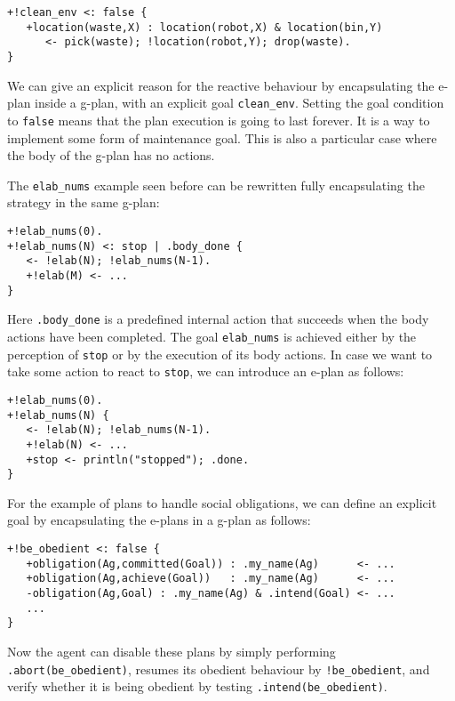 \begin{small}
\begin{verbatim}
+!clean_env <: false {
   +location(waste,X) : location(robot,X) & location(bin,Y)
      <- pick(waste); !location(robot,Y); drop(waste).
}
\end{verbatim}
\end{small}

\noindent We can give an explicit reason for the reactive behaviour by encapsulating the e-plan inside a g-plan, with an explicit goal \texttt{clean\_env}.
%
Setting the goal condition to \texttt{false} means that the plan
execution is going to last forever. It is a way to implement some form
of maintenance goal.
%
This is also a particular case where the body of the g-plan has no actions.
%

The \texttt{elab\_nums} example seen before can be rewritten fully encapsulating the strategy in the same g-plan:

{\small
\begin{verbatim}
+!elab_nums(0).
+!elab_nums(N) <: stop | .body_done {
   <- !elab(N); !elab_nums(N-1).	
   +!elab(M) <- ...
}
\end{verbatim}}

\noindent Here \texttt{.body\_done} is a predefined internal action that succeeds when the body actions have been completed. The goal \texttt{elab\_nums} is achieved either by the perception of \texttt{stop} or by the execution of its body actions.
%
In case we want to take some action to react to \texttt{stop}, we can introduce an e-plan as follows:

{\small
\begin{verbatim}
+!elab_nums(0).
+!elab_nums(N) {
   <- !elab(N); !elab_nums(N-1).
   +!elab(N) <- ...
   +stop <- println("stopped"); .done.
}
\end{verbatim}}

For the example of plans to handle social obligations, we can define an explicit goal by encapsulating the e-plans in a g-plan as follows:
\begin{small}
\begin{verbatim}
+!be_obedient <: false {
   +obligation(Ag,committed(Goal)) : .my_name(Ag)      <- ...
   +obligation(Ag,achieve(Goal))   : .my_name(Ag)      <- ...
   -obligation(Ag,Goal) : .my_name(Ag) & .intend(Goal) <- ...
   ...
}
\end{verbatim}
\end{small}
\noindent Now the agent can disable these plans by simply performing \texttt{.abort(be\_obedient)}, resumes its obedient behaviour by \texttt{!be\_obedient}, and verify whether it is being obedient by testing \texttt{.intend(be\_obedient)}.

